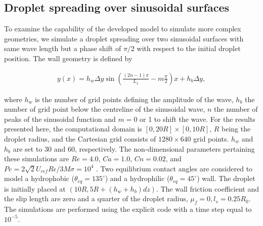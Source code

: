 \documentclass[review]{elsarticle}
\begin{document}
\subsection{Droplet spreading over sinusoidal surfaces}
To examine the capability of the developed model to simulate more complex geometries, we simulate a droplet spreading over two sinusoidal surfaces with same wave length but a phase shift of $\pi/2$ with respect to the initial droplet position. The wall geometry is defined by
\begin{linenomath}\begin{equation} \label{SinusoidalWall}
\begin{gathered}
 y(x) = h_w \Delta y \sin\left(\frac{(2n-1)\pi}{L_x}-m\frac{\pi}{2}\right)x+h_b \Delta y,
 \end{gathered}
\end{equation}\end{linenomath}
where $h_w$ is the number of grid points defining the amplitude of the wave, $h_b$ the number of grid point below the centreline of the sinusoidal wave, $n$ the number of peaks of the sinusoidal function and $m=0$ or 1 to shift the wave. For the results presented here, the computational domain  is $[0,20R] \times [0,10R] $, $R$ being the droplet radius, and the Cartesian grid consists of $1280\times640 $ grid points. $h_w$ and $h_b$ are set to 30 and 60, respectively. The non-dimensional parameters pertaining these simulations are $Re =4.0$,  $Ca=1.0$, $Cn=0.02$, and $Pe=2\sqrt{2} U_{ref} R \epsilon/3 M \sigma=10^4$ . Two equilibrium contact angles are considered to model a hydrophobic ($\theta_{eq}=135^\circ$) and a hydrophilic ($\theta_{eq}=45^\circ$) wall. The droplet is initially placed at $(10R,5R+(h_w+h_b)dz)$. The wall friction coefficient and the slip length are zero and a quarter of the droplet radius, $\mu_f=0,l_s=0.25R_0$. The simulations are performed using the explicit code with a time step equal to $10^{-5}$.
\end{document}
